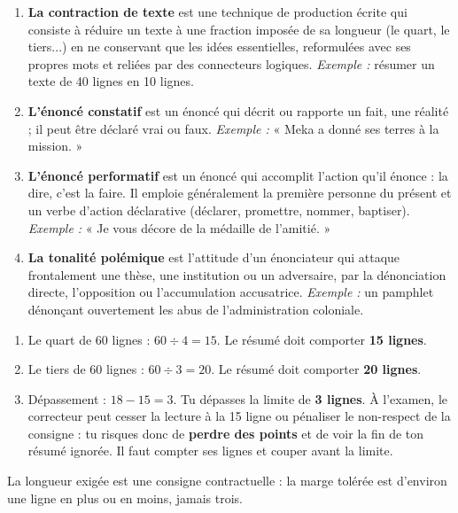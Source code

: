 \documentclass[11pt]{article}
\newcommand{\cle}[1]{{\popxbold\color{popdark}#1}}
\begin{document}
\begin{corrige}
\begin{enumerate}
\item \textbf{La contraction de texte} est une technique de production écrite qui consiste à réduire un texte à une fraction imposée de sa longueur (le quart, le tiers...) en ne conservant que les idées essentielles, reformulées avec ses propres mots et reliées par des connecteurs logiques. \emph{Exemple :} résumer un texte de 40 lignes en 10 lignes.
\item \textbf{L'énoncé constatif} est un énoncé qui décrit ou rapporte un fait, une réalité ; il peut être déclaré vrai ou faux. \emph{Exemple :} « Meka a donné ses terres à la mission. »
\item \textbf{L'énoncé performatif} est un énoncé qui accomplit l'action qu'il énonce : la dire, c'est la faire. Il emploie généralement la première personne du présent et un verbe d'action déclarative (déclarer, promettre, nommer, baptiser). \emph{Exemple :} « Je vous décore de la médaille de l'amitié. »
\item \textbf{La tonalité polémique} est l'attitude d'un énonciateur qui attaque frontalement une thèse, une institution ou un adversaire, par la dénonciation directe, l'opposition ou l'accumulation accusatrice. \emph{Exemple :} un pamphlet dénonçant ouvertement les abus de l'administration coloniale.
\end{enumerate}
\end{corrige}

\begin{corrige}
\begin{enumerate}
\item Le quart de 60 lignes : $60 \div 4 = 15$. Le résumé doit comporter \textbf{15 lignes}.
\item Le tiers de 60 lignes : $60 \div 3 = 20$. Le résumé doit comporter \textbf{20 lignes}.
\item Dépassement : $18 - 15 = 3$. Tu dépasses la limite de \textbf{3 lignes}. À l'examen, le correcteur peut cesser la lecture à la 15 ligne ou pénaliser le non-respect de la consigne : tu risques donc de \textbf{perdre des points} et de voir la fin de ton résumé ignorée. Il faut compter ses lignes et couper avant la limite.
\end{enumerate}
\end{corrige}

\begin{attention}
La longueur exigée est une \cle{consigne contractuelle} : la marge tolérée est d'environ une ligne en plus ou en moins, jamais trois.
\end{attention}
\end{document}

